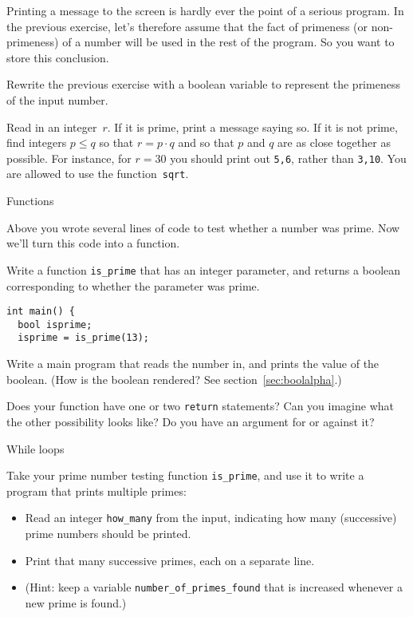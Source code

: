 Printing a message to the screen is hardly ever the point of a serious program.
In the previous exercise, let's therefore assume that the fact of primeness
(or non-primeness)
of a number
will be used in the rest of the program. So you want to store this conclusion.

\begin{exercise}
  \label{ex:prime:test2}
  Rewrite the previous exercise with a boolean variable to represent
  the primeness of the input number.
\end{exercise}

\begin{exercise}
  \label{ex:squaregrid}
  Read in an integer~$r$. If it is prime, print a message saying so.
  If it is not prime, find integers $p\leq q$ so that $r=p\cdot q$ and so
  that $p$ and $q$ are as close together as possible.
  For instance, for $r=30$ you should print out \lstinline{5,6}, rather than
  \lstinline{3,10}. You are allowed to use the function~\lstinline{sqrt}.
\end{exercise}

 {Functions}


Above you wrote several lines of code to test whether a number was prime.
Now we'll turn this code into a function.

\begin{exercise}
  \label{ex:prime:func}
  Write a function \lstinline{is_prime} that has an integer parameter, and returns a boolean
  corresponding to whether the parameter was prime.
\begin{lstlisting}
int main() {
  bool isprime;
  isprime = is_prime(13);
\end{lstlisting}
Write a main program that reads the number in,
and prints the value of the boolean.
(How is the boolean rendered? See section~\ref{sec:boolalpha}.)

  Does your function have one or two \lstinline{return} statements?
  Can you imagine what the other possibility looks like?
  Do you have an argument for or against it?
\end{exercise}

 {While loops}


\begin{exercise}
  \label{ex:prime:while}
  Take your prime number testing function \lstinline{is_prime}, and use it to
  write a program that prints multiple primes:
  \begin{itemize}
  \item Read an integer \lstinline{how_many} from the input, indicating how
    many (successive) prime numbers should be printed.
  \item Print that many successive primes, each on a separate line.
  \item (Hint: keep a variable
    \lstinline{number_of_primes_found} that is increased whenever a new prime is found.)
  \end{itemize}
\end{exercise}

